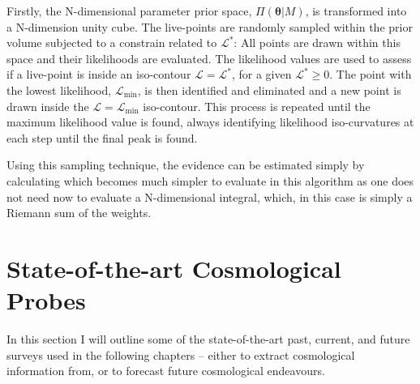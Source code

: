 \qquad Firstly, the N-dimensional parameter prior space, $\Pi(\bm{\theta}|M)$, is transformed into a N-dimension unity cube. The live-points are randomly sampled within the prior volume subjected to a constrain related to $\mathcal{L}^*$:
All points are drawn within this space and their likelihoods are evaluated. The likelihood values are used to assess if a live-point is inside an iso-contour $\mathcal{L} = \mathcal{L}^*$, for a given $\mathcal{L}^*\geq 0$. The point with the lowest likelihood, $\mathcal{L}_{\min}$, is then identified and eliminated and a new point is drawn inside the $\mathcal{L} = \mathcal{L}_{\min}$ iso-contour. This process is repeated until the maximum likelihood value is found, always identifying likelihood iso-curvatures at each step until the final peak is found.

\qquad Using this sampling technique, the evidence can be estimated simply by calculating
which becomes much simpler to evaluate in this algorithm as one does not need now to evaluate a N-dimensional integral, which, in this case is simply a Riemann sum of the weights.

\section{State-of-the-art Cosmological Probes}\label{sec:intro:probes}
In this section I will outline some of the state-of-the-art past, current, and future surveys used in the following chapters -- either to extract cosmological information from, or to forecast future cosmological endeavours.


